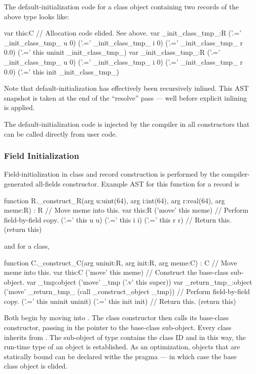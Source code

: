 The default-initialization code for a class object containing two records of the above type
looks like:
\begin{chapelcode}
    var this:C
    // Allocation code elided. See above.
    var _init_class_tmp_:R
    ('.=' _init_class_tmp_ u 0)
    ('.=' _init_class_tmp_ i 0)
    ('.=' _init_class_tmp_ r 0.0)
    ('.=' this uninit _init_class_tmp_)
    var _init_class_tmp_:R
    ('.=' _init_class_tmp_ u 0)
    ('.=' _init_class_tmp_ i 0)
    ('.=' _init_class_tmp_ r 0.0)
    ('.=' this init _init_class_tmp_)
\end{chapelcode}
\noindent
Note that default-initialization has effectively been recursively inlined.  This AST snapshot
is taken at the end of the ``resolve'' pass --- well before explicit inlining is applied.

The default-initialization code is injected by the compiler in all constructors that can be
called directly from user code.

\subsubsection{Field Initialization}

Field-initialization in class and record construction is performed by the
compiler-generated all-fields constructor.  Example AST for this function for a record is
\begin{chapelcode}
  function R._construct_R(arg u:uint(64), arg i:int(64), arg r:real(64), arg meme:R) : R
  {
    // Move meme into this.
    var this:R
    ('move' this meme)
    // Perform field-by-field copy.
    ('.=' this u u)
    ('.=' this i i)
    ('.=' this r r)
    // Return this.
    (return this)
  }
\end{chapelcode}
and for a class,
\begin{chapelcode}
  function C._construct_C(arg uninit:R, arg init:R, arg meme:C) : C
  {
    // Move meme into this.
    var this:C
    ('move' this meme)
    // Construct the base-class sub-object.
    var _tmp:object
    ('move' _tmp ('.v' this super))
    var _return_tmp_:object
    ('move' _return_tmp_ (call _construct_object _tmp))
    // Perform field-by-field copy.
    ('.=' this uninit uninit)
    ('.=' this init init)
    // Return this.
    (return this)
  }
\end{chapelcode}
Both begin by moving  into .  The class constructor then calls its
base-class constructor, passing in the pointer to the base-class sub-object.  Every class
inherits from .  The sub-object of type  contains the class ID
and in this way, the run-time type of an object is established.  As an optimization,
objects that are statically bound can be declared withe the  pragma ---
in which case the  base class object is elided.

